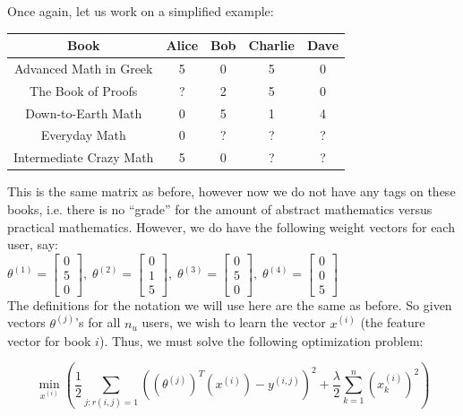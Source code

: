 \documentclass[11pt,a4paper,oneside]{report}
\begin{document}
Once again, let us work on a simplified example:

\begin{center}
\begin{tabular}{| c | c | c | c | c |}
\hline
Book & Alice & Bob & Charlie & Dave \\
\hline
Advanced Math in Greek & 5 & 0 & 5 & 0\\
\hline
The Book of Proofs & ? & 2 & 5 & 0\\
\hline
Down-to-Earth Math & 0 & 5 & 1 & 4\\
\hline
Everyday Math & 0 & ? & ? & ? \\
\hline
Intermediate Crazy Math & 5 & 0 & ? & ?\\
\hline
\end{tabular}
\end{center}

This is the same matrix as before, however now we do not have any tags on these books, i.e. there is no ``grade'' for the amount of abstract mathematics versus practical mathematics. However, we do have the following weight vectors for each user, say:\\

$\theta^{(1)} = \begin{bmatrix}
0\\ 5\\ 0
\end{bmatrix}, \; \theta^{(2)} = \begin{bmatrix}
0\\ 1\\ 5
\end{bmatrix}, \; \theta^{(3)} = \begin{bmatrix}
0\\ 5\\ 0
\end{bmatrix}, \; \theta^{(4)} = \begin{bmatrix}
0\\ 0\\ 5
\end{bmatrix}$\\

The definitions for the notation we will use here are the same as before. So given vectors $\theta^{(j)}$'s for all $n_u$ users, we wish to learn the vector $x^{(i)}$ (the feature vector for book $i$). Thus, we must solve the following optimization problem:

\[
\boxed{\min_{x^{(i)}} \left(\frac{1}{2} \sum_{j:r(i,j)=1}((\theta^{(j)})^T(x^{(i)}) - y^{(i,j)})^2 + \frac{\lambda}{2}\sum_{k=1}^n(x^{(i)}_k)^2\right)}
\]\\
\end{document}
